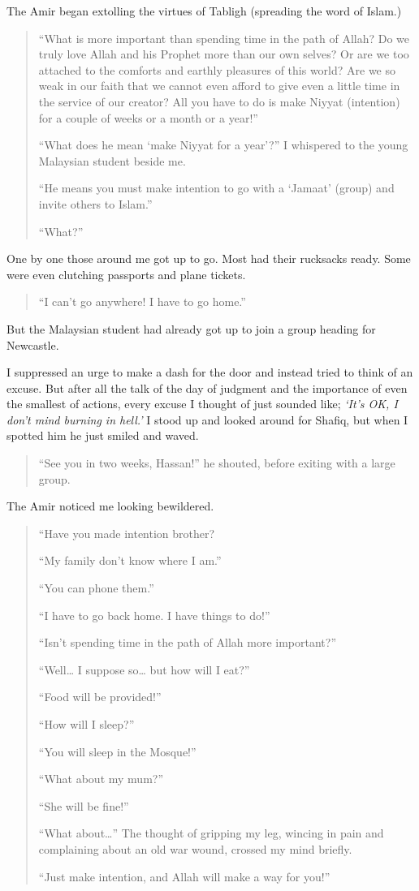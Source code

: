 \documentclass[12pt]{memoir}
\begin{document}
The Amir began extolling the virtues of Tabligh (spreading the word of Islam.)

\begin{quote}
“What is more important than spending time in the path of Allah?
Do we truly love Allah and his Prophet more than our own selves?
Or are we too attached to the comforts and earthly pleasures of this world?
Are we so weak in our faith that we cannot even afford to give
even a little time in the service of our creator?
All you have to do is make Niyyat (intention)
for a couple of weeks or a month or a year!”

“What does he mean ‘make Niyyat for a year’?”
I whispered to the young Malaysian student beside me.

“He means you must make intention to go with a ‘Jamaat’ (group)
and invite others to Islam.”

“What?”
\end{quote}

One by one those around me got up to go.
Most had their rucksacks ready.
Some were even clutching passports and plane tickets.

\begin{quote}
“I can’t go anywhere! I have to go home.”
\end{quote}

But the Malaysian student had already got up
to join a group heading for Newcastle.

I suppressed an urge to make a dash for the door
and instead tried to think of an excuse.
But after all the talk of the day of judgment
and the importance of even the smallest of actions,
every excuse I thought of just sounded like;
\emph{‘It’s OK, I don’t mind burning in hell.’}
I stood up and looked around for Shafiq,
but when I spotted him he just smiled and waved.

\begin{quote}
“See you in two weeks, Hassan!” he shouted, before exiting with a large group.
\end{quote}

The Amir noticed me looking bewildered.

\begin{quote}
“Have you made intention brother?

“My family don’t know where I am.”

“You can phone them.”

“I have to go back home. I have things to do!”

“Isn’t spending time in the path of Allah more important?”

“Well… I suppose so… but how will I eat?”

“Food will be provided!”

“How will I sleep?”

“You will sleep in the Mosque!”

“What about my mum?”

“She will be fine!”

“What about…” The thought of gripping my leg,
wincing in pain and complaining about an old war wound,
crossed my mind briefly.

“Just make intention, and Allah will make a way for you!”
\end{quote}
\end{document}
